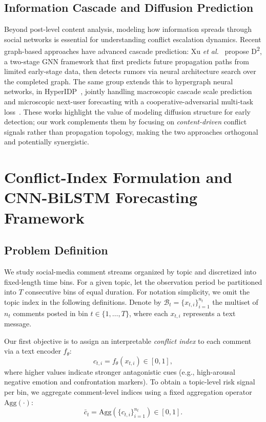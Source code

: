 \documentclass[journal]{IEEEtran}
\begin{document}
\subsection{Information Cascade and Diffusion Prediction}

Beyond post-level content analysis, modeling how information spreads through social networks is essential for understanding conflict escalation dynamics. Recent graph-based approaches have advanced cascade prediction: Xu \emph{et al.}~\cite{xu2025d2} propose D\textsuperscript{2}, a two-stage GNN framework that first predicts future propagation paths from limited early-stage data, then detects rumors via neural architecture search over the completed graph. The same group extends this to hypergraph neural networks, in HyperIDP~\cite{xu2025hyperidp}, jointly handling macroscopic cascade scale prediction and microscopic next-user forecasting with a cooperative-adversarial multi-task loss~\cite{xu2025hyperidpB}. These works highlight the value of modeling diffusion structure for early detection; our work complements them by focusing on \emph{content-driven} conflict signals rather than propagation topology, making the two approaches orthogonal and potentially synergistic.

\section{Conflict-Index Formulation and CNN-BiLSTM Forecasting Framework}

\subsection{Problem Definition}

We study social-media comment streams organized by topic and discretized into fixed-length time bins. For a given topic, let the observation period be partitioned into $T$ consecutive bins of equal duration. For notation simplicity, we omit the topic index in the following definitions. Denote by $\mathcal{B}_t = \{x_{t,i}\}_{i=1}^{n_t}$ the multiset of $n_t$ comments posted in bin $t \in \{1, \dots, T\}$, where each $x_{t,i}$ represents a text message.

Our first objective is to assign an interpretable \emph{conflict index} to each comment via a text encoder $f_\theta$:
\begin{equation}
c_{t,i} = f_\theta(x_{t,i}) \in [0, 1],
\end{equation}
where higher values indicate stronger antagonistic cues (e.g., high-arousal negative emotion and confrontation markers). To obtain a topic-level risk signal per bin, we aggregate comment-level indices using a fixed aggregation operator $\mathrm{Agg}(\cdot)$:
\begin{equation}
\bar{c}_t = \mathrm{Agg}\left(\{c_{t,i}\}_{i=1}^{n_t}\right) \in [0, 1].
\end{equation}
\end{document}
